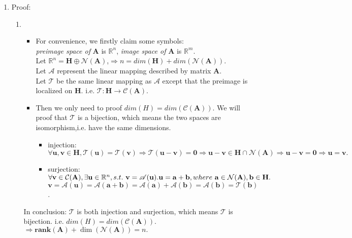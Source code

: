 \documentclass[11pt,letter,notitlepage]{article}
\newcommand{\rank}[1]{ \textbf{rank}  (#1)  }
\begin{document}
\begin{solution}
\begin{enumerate}
        \item Proof:
        \begin{enumerate}
            \item 
            \begin{itemize}
                \item 
                For convenience, we firstly claim some symbols:\\
                \emph{preimage space of} $\mathbf{A}$ is $\mathbb{R}^n$, \emph{image space of} $\mathbf{A}$ is $\mathbb{R}^m$.\\
                Let $\mathbb{R}^n=\mathbf{H} \oplus \mathcal{N}(\mathbf{A})$,$\Rightarrow n=dim(\mathbf{H})+dim(\mathcal{N}(\mathbf{A}))$.\\
				Let $\mathscr{A}$ represent the linear mapping described by matrix $\mathbf{A}$.\\
				Let $\mathscr{T}$ be the same linear mapping as $\mathscr{A}$ except that the preimage is localized on $\mathbf{H}$. i.e. $\mathbf{\mathscr{T}:H \rightarrow \mathcal{C}(\mathbf{A})}$.
				\item
				Then we only need to proof $dim(H)=dim(\mathcal{C}(\mathbf{A}))$. We will proof that $\mathscr{T}$ is a bijection, which means the two spaces are isomorphism,i.e. have the same dimensions.
				\begin{itemize}
					\item injection: \\
					$\forall \mathbf{u,v} \in \mathbf{H}, \mathbf{\mathscr{T}(u)=\mathscr{T}(v)}\Rightarrow \mathbf{\mathscr{T}(u-v)=0} \Rightarrow
					\mathbf{u-v \in H}\cap\mathcal{N}(\mathbf{A})\Rightarrow \mathbf{u-v=0}\Rightarrow\mathbf{u=v}.$ 
					\item surjection: \\
					$\forall \mathbf{v} \in \mathcal{C}(\mathbf{A}), \exists\mathbf{u} \in \mathbb{R}^n, s.t.~ \mathbf{v}=\mathscr{A}(\mathbf{u}). \\ 
					\mathbf{u=a+b}, where~ \mathbf{a \in \mathcal{N}(A), b \in H}.$\\
					$\mathbf{v=\mathscr{A}(u)=\mathscr{A}(a+b)=\mathscr{A}(a)+\mathscr{A}(b)=\mathscr{A}(b)=\mathscr{T}(b)}$.
				\end{itemize}
            \end{itemize}
			In conclusion: $\mathscr{T}$ is both injection and surjection, which means $\mathscr{T}$ is bijection. i.e. $dim(H)=dim(\mathcal{C}(\mathbf{A}))$. $\Rightarrow \rank{\mathbf{A}} + \dim ( \mathcal{N}( \mathbf{A} ) ) = n.$ \qedsymbol
			

\end{enumerate}
\end{enumerate}
\end{solution}
\end{document}

